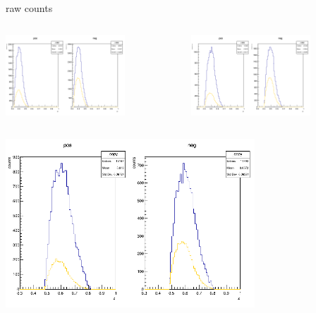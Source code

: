 \begin{frame}{raw counts}
\begin{columns}
\begin{column}[T]{0.5\textwidth}
\includegraphics[width = 0.7\textwidth]{results/yield/statistics/counts_x_Q2_z_0.50_3.979_0.40.png}
\end{column}
\begin{column}[T]{0.5\textwidth}
\includegraphics[width = 0.7\textwidth]{results/yield/statistics/counts_x_Q2_z_0.50_3.979_0.50.png}
\end{column}
\end{columns}
\begin{columns}
\begin{column}[T]{0.5\textwidth}
\includegraphics[width = 0.7\textwidth]{results/yield/statistics/counts_x_Q2_z_0.50_3.979_0.60.png}

\end{column}
\end{columns}
\end{frame}
